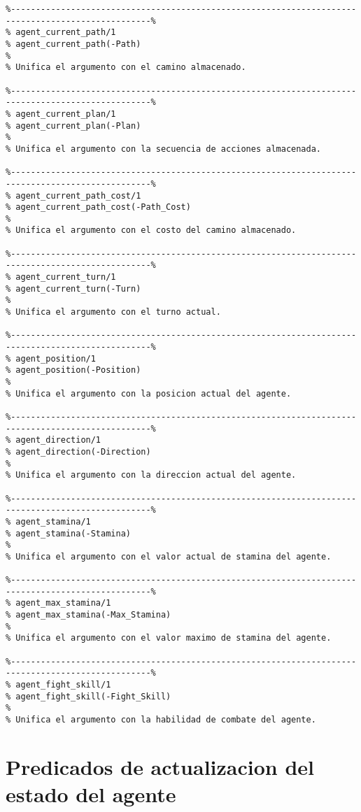 \documentclass[a4paper,12pt]{report}
\begin{document}
\begin{scriptsize}
\begin{verbatim}
%--------------------------------------------------------------------------------------------------%
% agent_current_path/1
% agent_current_path(-Path)
%
% Unifica el argumento con el camino almacenado.

%--------------------------------------------------------------------------------------------------%
% agent_current_plan/1
% agent_current_plan(-Plan)
%
% Unifica el argumento con la secuencia de acciones almacenada.

%--------------------------------------------------------------------------------------------------%
% agent_current_path_cost/1
% agent_current_path_cost(-Path_Cost)
%
% Unifica el argumento con el costo del camino almacenado.

%--------------------------------------------------------------------------------------------------%
% agent_current_turn/1
% agent_current_turn(-Turn)
%
% Unifica el argumento con el turno actual.

%--------------------------------------------------------------------------------------------------%
% agent_position/1
% agent_position(-Position)
%
% Unifica el argumento con la posicion actual del agente.

%--------------------------------------------------------------------------------------------------%
% agent_direction/1
% agent_direction(-Direction)
%
% Unifica el argumento con la direccion actual del agente.

%--------------------------------------------------------------------------------------------------%
% agent_stamina/1
% agent_stamina(-Stamina)
%
% Unifica el argumento con el valor actual de stamina del agente. 

%--------------------------------------------------------------------------------------------------%
% agent_max_stamina/1
% agent_max_stamina(-Max_Stamina)
%
% Unifica el argumento con el valor maximo de stamina del agente.  

%--------------------------------------------------------------------------------------------------%
% agent_fight_skill/1
% agent_fight_skill(-Fight_Skill)
%
% Unifica el argumento con la habilidad de combate del agente. 
\end{verbatim}
\end{scriptsize}

\section{Predicados de actualizacion del estado del agente}
\end{document}
